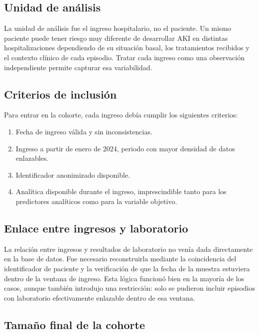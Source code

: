 \documentclass[12pt, a4paper, oneside]{report}
\begin{document}
\subsection{Unidad de análisis}

La unidad de análisis fue el ingreso hospitalario, no el paciente. Un mismo paciente puede tener riesgo muy diferente de desarrollar AKI en distintas hospitalizaciones dependiendo de su situación basal, los tratamientos recibidos y el contexto clínico de cada episodio. Tratar cada ingreso como una observación independiente permite capturar esa variabilidad.

\subsection{Criterios de inclusión}

Para entrar en la cohorte, cada ingreso debía cumplir los siguientes criterios:

\begin{enumerate}
    \item Fecha de ingreso válida y sin inconsistencias.
    \item Ingreso a partir de enero de 2024, periodo con mayor densidad de datos enlazables.
    \item Identificador anonimizado disponible.
    \item Analítica disponible durante el ingreso, imprescindible tanto para los predictores analíticos como para la variable objetivo.
\end{enumerate}

\subsection{Enlace entre ingresos y laboratorio}

La relación entre ingresos y resultados de laboratorio no venía dada directamente en la base de datos. Fue necesario reconstruirla mediante la coincidencia del identificador de paciente y la verificación de que la fecha de la muestra estuviera dentro de la ventana de ingreso. Esta lógica funcionó bien en la mayoría de los casos, aunque también introdujo una restricción: solo se pudieron incluir episodios con laboratorio efectivamente enlazable dentro de esa ventana.

\subsection{Tamaño final de la cohorte}
\end{document}
